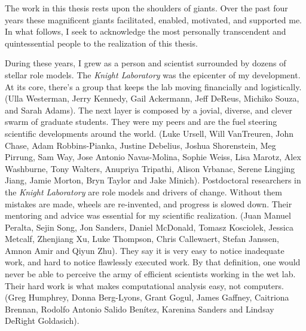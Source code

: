 \begin{frontmatter}
\printglossary[title=List of Abbreviations,toctitle=List of Abbreviations,nonumberlist ]
\listoffigures  %
\listoftables   %

%
%
\begin{acknowledgements}

    The work in this thesis rests upon the shoulders of giants. Over the past 
    four years these magnificent giants facilitated, enabled, motivated, and 
    supported me.  In what follows, I seek to acknowledge the most personally 
    transcendent and quintessential people to the realization of this thesis.

    During these years, I grew as a person and scientist surrounded by dozens 
    of stellar role models. The \textit{Knight Laboratory} was the epicenter of 
    my development. At its core, there's a group that keeps the lab moving 
    financially and logistically. (Ulla Westerman, Jerry Kennedy, Gail 
    Ackermann, Jeff DeReus, Michiko Souza, and Sarah Adams). The next layer is 
    composed by a jovial, diverse, and clever swarm of graduate students.  They 
    were my peers and are the fuel steering scientific developments around the 
    world. (Luke Ursell, Will VanTreuren, John Chase, Adam Robbins-Pianka, 
    Justine Debelius, Joshua Shorenstein, Meg Pirrung, Sam Way, Jose Antonio 
    Navas-Molina, Sophie Weiss, Lisa Marotz, Alex Washburne, Tony Walters, 
    Anupriya Tripathi, Alison Vrbanac, Serene Lingjing Jiang, Jamie Morton, 
    Bryn Taylor and Jake Minich). Postdoctoral researchers in the 
    \textit{Knight Laboratory} are role models and drivers of change. Without 
    them mistakes are made, wheels are re-invented, and progress is slowed 
    down. Their mentoring and advice was essential for my scientific 
    realization. (Juan Manuel Peralta, Sejin Song, Jon Sanders, Daniel 
    McDonald, Tomasz Kosciolek, Jessica Metcalf, Zhenjiang Xu, Luke Thompson, 
    Chris Callewaert, Stefan Janssen, Amnon Amir and Qiyun Zhu). They say
    it is very easy to notice inadequate work, and hard to notice flawlessly 
    executed work. By that definition, one would never be able to perceive the 
    army of efficient scientists working in the wet lab. Their hard work is 
    what makes computational analysis easy, not computers. (Greg Humphrey, 
    Donna Berg-Lyons, Grant Gogul, James Gaffney, Caitriona Brennan, Rodolfo 
    Antonio Salido Ben\'itez, Karenina Sanders and Lindsay DeRight Goldasich).


\end{acknowledgements}
\end{frontmatter}
